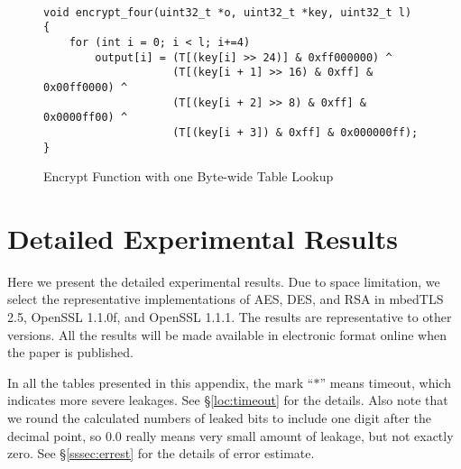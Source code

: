~

\begin{figure}[h!]
    \centering
    \begin{lstlisting}[xleftmargin=.02\textwidth,xrightmargin=.01\textwidth]
void encrypt_four(uint32_t *o, uint32_t *key, uint32_t l)
{
    for (int i = 0; i < l; i+=4)
        output[i] = (T[(key[i] >> 24)] & 0xff000000) ^
                    (T[(key[i + 1] >> 16) & 0xff] & 0x00ff0000) ^
                    (T[(key[i + 2] >> 8) & 0xff] & 0x0000ff00) ^
                    (T[(key[i + 3]) & 0xff] & 0x000000ff);
}
    \end{lstlisting}
    \caption{Encrypt Function with one Byte-wide Table Lookup}
    \label{fig:four_byte_table_lookup}
\end{figure}



\section{Detailed Experimental Results}
\label{sec:result-table}

Here we present the detailed experimental results.
Due to space limitation, we select the representative implementations of
AES, DES, and RSA in
mbedTLS 2.5,
OpenSSL 1.1.0f,  and
OpenSSL 1.1.1.  
The results are representative to other versions.
All the results will be made available in electronic format online
when the paper is published. %

In all the tables presented in this appendix, the mark ``$*$'' means timeout,
which indicates more severe leakages. See \S\ref{loc:timeout} for the details.
Also note that we round the calculated numbers of leaked bits to include one digit
after the decimal point, so $0.0$ really means very small amount of leakage, but not exactly zero. See \S\ref{sssec:errest} for the details of error estimate.







